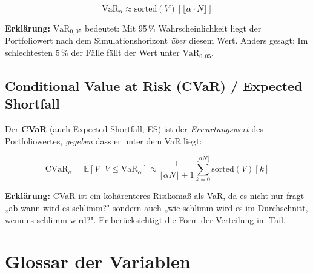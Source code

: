 \documentclass[12pt, a4paper]{article}
\begin{document}
\begin{equation}
    \text{VaR}_\alpha \approx \text{sorted}(V)\!\left[\lfloor \alpha \cdot N \rfloor\right]
\end{equation}

\textbf{Erklärung:} $\text{VaR}_{0{,}05}$ bedeutet: Mit 95\,\% Wahrscheinlichkeit
liegt der Portfoliowert nach dem Simulationshorizont \emph{über} diesem Wert.
Anders gesagt: Im schlechtesten 5\,\% der Fälle fällt der Wert unter $\text{VaR}_{0{,}05}$.

\subsection{Conditional Value at Risk (CVaR) / Expected Shortfall}

Der \textbf{CVaR} (auch Expected Shortfall, ES) ist der \emph{Erwartungswert}
des Portfoliowertes, \emph{gegeben} dass er unter dem VaR liegt:

\begin{equation}
    \text{CVaR}_\alpha = \mathbb{E}\!\left[V \,\Big|\, V \leq \text{VaR}_\alpha\right]
    \approx \frac{1}{\lfloor \alpha N \rfloor + 1}
    \sum_{k=0}^{\lfloor \alpha N \rfloor} \text{sorted}(V)[k]
\end{equation}

\textbf{Erklärung:} CVaR ist ein kohärenteres Risikomaß als VaR, da es nicht
nur fragt „ab wann wird es schlimm?" sondern auch „wie schlimm wird es im
Durchschnitt, wenn es schlimm wird?". Er berücksichtigt die Form der Verteilung
im Tail.

\section{Glossar der Variablen}
\end{document}
